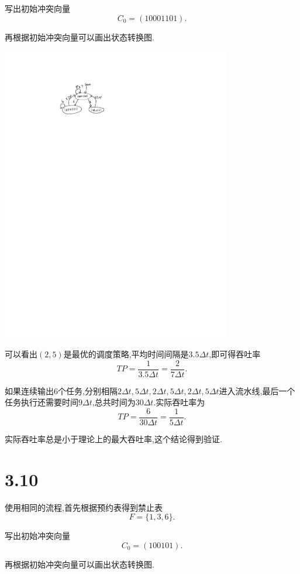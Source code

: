 \documentclass[adobefonts, nocap]{ctexart}
\begin{document}
    写出初始冲突向量
    \[
      C_{0}=(10001101).
    \]

    再根据初始冲突向量可以画出状态转换图.

    \begin{center}
      \includegraphics[width=10cm]{2-crop.pdf}
    \end{center}

    可以看出$(2,5)$是最优的调度策略,平均时间间隔是$3.5\Delta t$,即可得吞吐率
    \[
      TP=\frac{1}{3.5\Delta t}=\frac{2}{7\Delta t}.
    \]

    如果连续输出$6$个任务,分别相隔$2\Delta t, 5\Delta t, 2\Delta t, 5\Delta t, 2\Delta t, 5\Delta t$进入流水线,最后一个任务执行还需要时间$9\Delta t$,总共时间为$30\Delta t$.实际吞吐率为
    \[
      TP=\frac{6}{30\Delta t}=\frac{1}{5\Delta t}.
    \]

    实际吞吐率总是小于理论上的最大吞吐率,这个结论得到验证.
  \section*{3.10}
    使用相同的流程,首先根据预约表得到禁止表
    \[
      F=\{1,3,6\}.
    \]

    写出初始冲突向量
    \[
      C_{0}=(100101).
    \]

    再根据初始冲突向量可以画出状态转换图.
\end{document}
